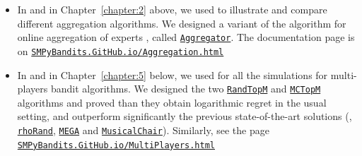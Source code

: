 \begin{itemize}
    \item
In \cite{Besson2018WCNC} and in Chapter~\ref{chapter:2} above, we used \SMPyBandits{} to illustrate and compare different aggregation algorithms. We designed a variant of the \ExpFour{} algorithm for online aggregation of experts \cite{Bubeck12}, called \texttt{\href{https://SMPyBandits.GitHub.io/docs/Policies.Aggregator.html}{Aggregator}}.
The documentation page is on \texttt{\href{https://SMPyBandits.GitHub.io/Aggregation.html}{SMPyBandits.GitHub.io/Aggregation.html}}

    \item
In \cite{Besson2018ALT} and in Chapter~\ref{chapter:5} below, we used \SMPyBandits{} for all the simulations for multi-players bandit algorithms. We designed the two \texttt{\href{https://SMPyBandits.GitHub.io/docs/PoliciesMultiPlayers.RandTopM.html}{RandTopM}} and \texttt{\href{https://SMPyBandits.GitHub.io/docs/PoliciesMultiPlayers.MCTopM.html}{MCTopM}} algorithms and proved than they obtain logarithmic regret in the usual setting, and outperform significantly the previous state-of-the-art solutions (\ie, \texttt{\href{https://SMPyBandits.GitHub.io/docs/PoliciesMultiPlayers.rhoRand.html}{rhoRand}}, \texttt{\href{https://SMPyBandits.GitHub.io/docs/Policies.MEGA.html}{MEGA}} and \texttt{\href{https://SMPyBandits.GitHub.io/docs/Policies.MusicalChair.html}{MusicalChair}}).
Similarly, see the page \texttt{\href{https://SMPyBandits.GitHub.io/MultiPlayers.html}{SMPyBandits.GitHub.io/MultiPlayers.html}}


\end{itemize}
